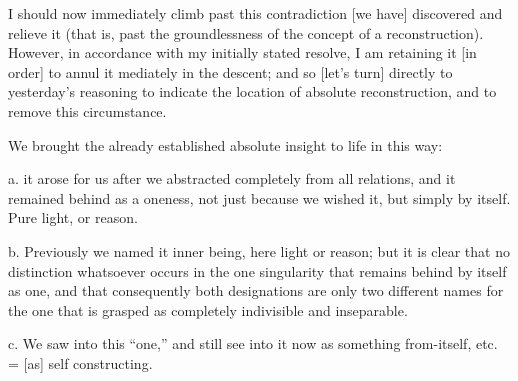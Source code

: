 I should now immediately climb past this
contradiction [we have] discovered and relieve it
(that is, past the groundlessness of
the concept of a reconstruction).
However, in accordance with my initially stated resolve,
I am retaining it [in order] to annul it mediately in the descent;
and so [let's turn] directly to yesterday's reasoning
to indicate the location of absolute reconstruction,
and to remove this circumstance.

We brought the already established absolute insight
to life in this way:

a. it arose for us after
we abstracted completely from all relations,
and it remained behind as a oneness,
not just because we wished it,
but simply by itself.
Pure light, or reason.

b. Previously we named it inner being,
here light or reason;
but it is clear that no distinction whatsoever occurs
in the one singularity that remains behind by itself as one,
and that consequently both designations are only
two different names for the one
that is grasped as completely
indivisible and inseparable.

c. We saw into this “one,”
and still see into it now as
something from-itself, etc. =
[as] self constructing.

